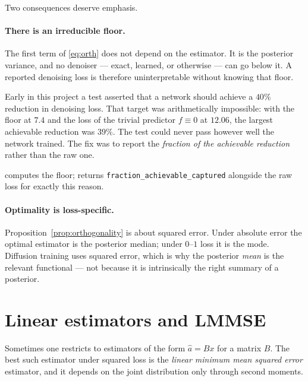 Two consequences deserve emphasis.

\paragraph{There is an irreducible floor.} The first term of \eqref{eq:orth} does not depend
on the estimator. It is the posterior variance, and no denoiser --- exact, learned, or
otherwise --- can go below it. A reported denoising loss is therefore uninterpretable without
knowing that floor.

\begin{pitfall}
Early in this project a test asserted that a network should achieve a $40\%$ reduction in
denoising loss. That target was arithmetically impossible: with the floor at $7.4$ and the
loss of the trivial predictor $f\equiv0$ at $12.06$, the largest achievable reduction was
$39\%$. The test could never pass however well the network trained. The fix was to report the
\emph{fraction of the achievable reduction} rather than the raw one.
\begin{codebox}
 computes the floor;
 returns
\texttt{fraction\_achievable\_captured} alongside the raw loss for exactly this reason.
\end{codebox}
\end{pitfall}

\paragraph{Optimality is loss-specific.} Proposition~\ref{prop:orthogonality} is about squared
error. Under absolute error the optimal estimator is the posterior median; under $0$--$1$ loss
it is the mode. Diffusion training uses squared error, which is why the posterior \emph{mean}
is the relevant functional --- not because it is intrinsically the right summary of a
posterior.

\section{Linear estimators and LMMSE}
\label{sec:lmmse-intro}

Sometimes one restricts to estimators of the form $\widehat{a} = Bx$ for a matrix $B$. The
best such estimator under squared loss is the \emph{linear minimum mean squared error}
estimator, and it depends on the joint distribution only through second moments.

